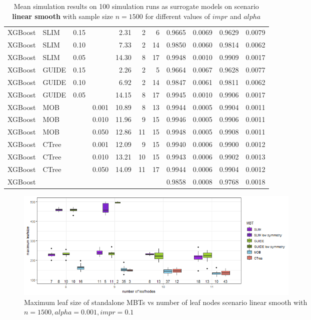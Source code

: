 \begin{table}[!htb]
\begin{tabular}[t]{l|l|r|r|r|r|r|r|r|r|r}
XGBoost & SLIM & 0.15 & & 2.31 & 2 & 6 & 0.9665 & 0.0069 & 0.9629 & 0.0079\\
XGBoost & SLIM & 0.10 & & 7.33 & 2 & 14 & 0.9850 & 0.0060 & 0.9814 & 0.0062\\
XGBoost & SLIM & 0.05 & & 14.30 & 8 & 17 & 0.9948 & 0.0010 & 0.9909 & 0.0017\\
XGBoost & GUIDE & 0.15 & & 2.26 & 2 & 5 & 0.9664 & 0.0067 & 0.9628 & 0.0077\\
XGBoost & GUIDE & 0.10 & & 6.92 & 2 & 14 & 0.9847 & 0.0061 & 0.9811 & 0.0062\\
XGBoost & GUIDE & 0.05 & & 14.15 & 8 & 17 & 0.9945 & 0.0010 & 0.9906 & 0.0017\\
XGBoost & MOB & & 0.001 & 10.89 & 8 & 13 & 0.9944 & 0.0005 & 0.9904 & 0.0011\\
XGBoost & MOB & & 0.010 & 11.96 & 9 & 15 & 0.9946 & 0.0005 & 0.9906 & 0.0011\\
XGBoost & MOB & & 0.050 & 12.86 & 11 & 15 & 0.9948 & 0.0005 & 0.9908 & 0.0011\\
XGBoost & CTree & & 0.001 & 12.09 & 9 & 15 & 0.9940 & 0.0006 & 0.9900 & 0.0012\\
XGBoost & CTree & & 0.010 & 13.21 & 10 & 15 & 0.9943 & 0.0006 & 0.9902 & 0.0013\\
XGBoost & CTree & & 0.050 & 14.09 & 11 & 17 & 0.9944 & 0.0006 & 0.9904 & 0.0012\\
\hline
XGBoost &  & & &  &  &  & 0.9858 & 0.0008 & 0.9768 & 0.0018\\
\hline
\end{tabular}
\caption{Mean simulation results on 100 simulation runs as surrogate models on scenario \textbf{linear smooth} with sample size $n = 1500$ for different values of $impr$ and $alpha$}
\label{tab:app_linear_smooth_1000}
\end{table}


\begin{figure}[!htb]
     \centering
    \includegraphics[width=14cm]{Figures/simulations/chapter_5_simulation_study/basic_scenarios/linear_smooth/ls_1000_standalone_symmetrie.png}
    \caption{Maximum leaf size of standalone MBTs vs number of leaf nodes scenario linear smooth with $n=1500, alpha = 0.001, impr = 0.1$}
\label{fig:app_ls_1000_standalone_symmetrie}
\end{figure} 



